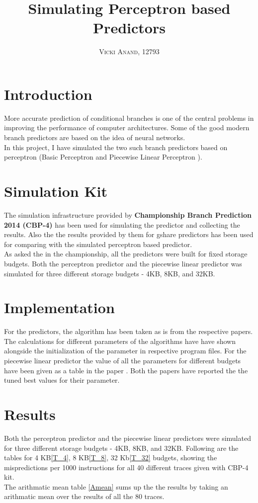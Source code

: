 \documentclass[paper=letter, fontsize=12pt]{article}
\title{\vspace{-15mm}\fontsize{24pt}{10pt}\selectfont\textbf{Simulating Perceptron based Predictors}} %
\author{
\large
{\textsc{Vicki Anand, 12793}}\\[2mm]
\vspace{-5mm}
}
\date{}
\begin{document}
\maketitle %
\thispagestyle{fancy} %

\section{Introduction}
More accurate prediction of conditional branches is one of the central problems in improving the performance of computer architectures.
Some of the good modern branch predictors are based on the idea of neural networks. \\
In this project, I have simulated the two such branch predictors based on perceptron (Basic Perceptron \cite{JimLin} and Piecewise Linear Perceptron \cite{Jim}).

\section{Simulation Kit}
The simulation infrastructure provided by \textbf{Championship Branch Prediction 2014 (CBP-4)} \cite{cbp} has been used for simulating the predictor and collecting the results. Also the the results provided by them for gshare predictors has been used for comparing with the simulated perceptron based predictor. \\
As asked the in the championship, all the predictors were built for fixed storage budgets. Both the perceptron predictor and the piecewise linear predictor was simulated for three different storage budgets - 4KB, 8KB, and 32KB.


\section{Implementation}
For the predictors, the algorithm has been taken as is from the respective papers. The calculations for different parameters of the algorithms have have shown alongside the initialization of the parameter in respective program files. For the piecewise linear predictor the value of all the parameters for different budgets have been given as a table in the paper \cite{Jim}. Both the papers have reported the the tuned best values for their parameter.


\section{Results}
Both the perceptron predictor and the piecewise linear predictors were simulated for three different storage budgets - 4KB, 8KB, and 32KB. Following are the tables for 4 KB\ref{T_4}, 8 KB\ref{T_8}, 32 Kb\ref{T_32} budgets, showing the mispredictions per 1000 instructions for all 40 different traces given with CBP-4 kit. \\
The arithmatic mean table \ref{Amean} sums up the the results by taking an arithmatic mean over the results of all the 80 traces.
\end{document}
